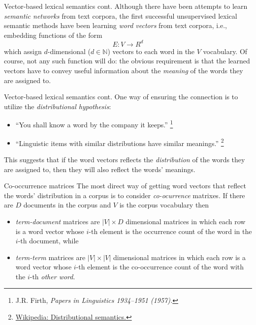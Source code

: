 \documentclass[style=upen, size=14pt]{powerdot}
\newcommand{\gold}{\color{arany}}
\theoremstyle{definition}
\begin{document}
\begin{slide}[toc=]{Vector-based lexical semantics cont.}
  Although there have been attempts to learn \emph{semantic networks} from text
  corpora, the first successful unsupervised lexical semantic methods have been
  learning \emph{\gold word vectors} from text corpora, i.e., embedding
  functions of the form
  $$
  E: V \rightarrow R^d
  $$
  which assign $d$-dimensional ($d\in \mathbb N$) vectors to each word in the
  $V$ vocabulary. Of course, not any such function will do: the obvious
  requirement is that the learned vectors have to convey useful information about
  the \emph{meaning} of the words they are assigned to.
\end{slide}

\begin{slide}[toc=]{Vector-based lexical semantics cont.}
  One way of ensuring the connection is to utilize the \emph{distributional hypothesis}:
  \begin{itemize}
  \item ``You shall know a word by the company it keeps.''
    \footnote{J.R. Firth, \emph{Papers in Linguistics 1934--1951 (1957).}}
  \item ``Linguistic items with similar distributions have similar meanings.''
    \footnote{\href{https://en.wikipedia.org/wiki/Distributional_semantics}{Wikipedia:
        Distributional semantics.}}
  \end{itemize}
  This suggests that if the word vectors reflects the \emph{distribution} of the
  words they are assigned to, then they will also reflect the words' meanings.
\end{slide}

\begin{slide}[toc=]{Co-occurrence matrices}
  The most direct way of getting word vectors that reflect the words'
  distribution in a corpus is to consider \emph{co-ocurrence} matrixes. If there
  are $D$ documents in the corpus and $V$ is the corpus vocabulary then
  \begin{itemize}
  \item \emph{\gold term-document} matrices are $|V|\times D$ dimensional
    matrices in which each row is a word vector whose $i$-th element is the
    occurrence count of the word in the $i$-th document, while
  \item \emph{\gold term-term} matrices are $|V|\times |V|$ dimensional matrices
    in which each row is a word vector whose $i$-th element is the co-occurrence
    count of the word with the $i$-th \emph{other word}.
  \end{itemize}
\end{slide}
\end{document}
